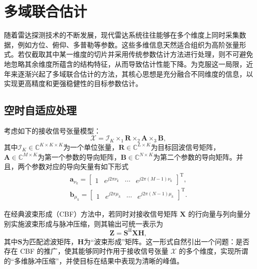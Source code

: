 \section{多域联合估计}
随着雷达探测技术的不断发展，现代雷达系统往往能够在多个维度上同时采集数据，例如方位、俯仰、多普勒等参数。这些多维信息天然适合组织为高阶张量形式。若仅截取其中某一维度的切片并采用传统参数估计方法进行处理，则不可避免地忽略其余维度所蕴含的结构特征，从而导致估计性能下降。为克服这一局限，近年来逐渐兴起了多域联合估计的方法，其核心思想是充分融合不同维度的信息，以实现更高精度和更强稳健性的目标参数估计。

\subsection{空时自适应处理}
考虑如下的接收信号张量模型：
\[
    \mathcal{X} = \mathcal{I}_{K} \times_1 \mathbf{R} \times_2 \mathbf{A} \times_3 \mathbf{B},
\]
其中\( \mathcal{I}_{K} \in \mathbb{C}^{K \times K \times K} \)为一个单位张量，\( \mathbf{R} \in \mathbb{C}^{L \times K} \)为目标回波信号矩阵，\( \mathbf{A} \in \mathbb{C}^{M \times K} \)为第一个参数的导向矩阵，\( \mathbf{B} \in \mathbb{C}^{N \times K} \)为第二个参数的导向矩阵。并且，两个参数对应的导向矢量有如下形式
\[
    \begin{split}
        \bm{a}_{\nu_k} = \begin{bmatrix}
                             1 & e^{j2\pi\nu_k} & \cdots & e^{j2\pi(M-1)\nu_k}
                         \end{bmatrix}^{\mathrm{T}}, \\
        \bm{b}_{\mu_k} = \begin{bmatrix}
                             1 & e^{j2\pi\mu_k} & \cdots & e^{j2\pi(N-1)\mu_k}
                         \end{bmatrix}^{\mathrm{T}}.
    \end{split}
\]

在经典波束形成（CBF）方法中，若同时对接收信号矩阵 \( \mathbf{X} \) 的行向量与列向量分别实施波束形成与脉冲压缩，则其输出可统一表示为
\[
    \mathbf{Z} = \mathbf{S}^{\mathrm{H}} \mathbf{X} \mathbf{H},
\]
其中\( \mathbf{S}  \)为匹配滤波矩阵，\( \mathbf{H} \)为``波束形成''矩阵。这一形式自然引出一个问题：是否存在 CBF 的推广，使其能够同时作用于接收信号张量 \( \mathcal{X} \) 的多个维度，实现所谓的``多维脉冲压缩''，并使目标在结果中表现为清晰的峰值。

